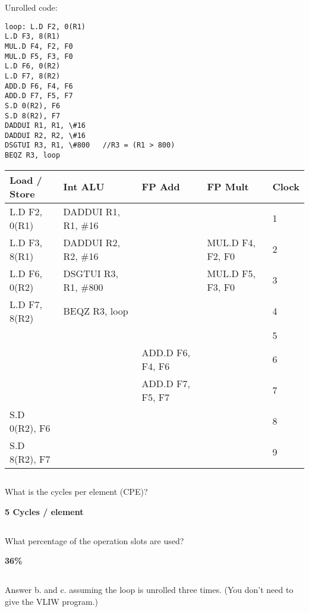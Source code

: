 \documentclass{article}
\begin{document}
Unrolled code:
\begin{lstlisting}
loop: L.D F2, 0(R1)
L.D F3, 8(R1)
MUL.D F4, F2, F0
MUL.D F5, F3, F0
L.D F6, 0(R2)
L.D F7, 8(R2)
ADD.D F6, F4, F6
ADD.D F7, F5, F7
S.D 0(R2), F6
S.D 8(R2), F7
DADDUI R1, R1, \#16
DADDUI R2, R2, \#16
DSGTUI R3, R1, \#800   //R3 = (R1 > 800)
BEQZ R3, loop   
\end{lstlisting}

\begin{tabular}{|l|l|l|l|l|}
\hline
Load / Store & Int ALU & FP Add & FP Mult & Clock\\
\hline
L.D F2, 0(R1) & DADDUI R1, R1, \#16 & & & 1\\
L.D F3, 8(R1) &  DADDUI R2, R2, \#16  & & MUL.D F4, F2, F0 & 2\\
L.D F6, 0(R2) &  DSGTUI R3, R1, \#800  & & MUL.D F5, F3, F0 &  3 \\
L.D F7, 8(R2) & BEQZ R3, loop & & & 4\\
&  & & & 5\\
&  & ADD.D F6, F4, F6 & & 6\\
& & ADD.D F7, F5, F7 & & 7\\
S.D 0(R2), F6 & & & & 8 \\
S.D 8(R2), F7 & & & & 9 \\
\hline

\end{tabular}


\subsection{}
What is the cycles per element (CPE)?


\textbf{5 Cycles / element}
\subsection{}
What percentage of the operation slots are used? 

\textbf{36\%}
\subsection{}
Answer b. and c. assuming the loop is unrolled three times. (You don't need to give the VLIW program.)
\end{document}
